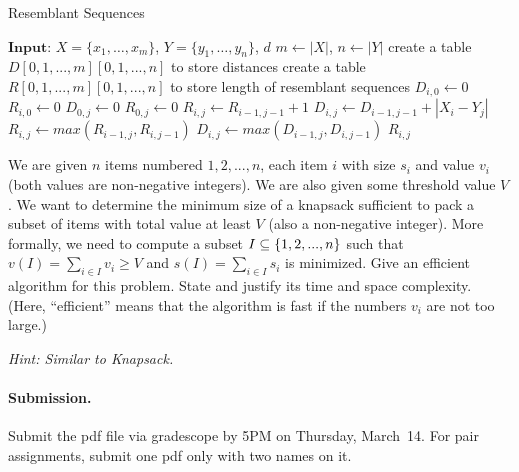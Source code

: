 \documentclass[11pt]{article}
\begin{document}
\begin{algorithm}
    \begin{algorithmic}[1]
        \caption{Resemblant Sequences}
        \State $\textbf{Input: } X =\{x_1,\dots,x_m\}$, $Y =\{y_1,\dots,y_n\}$, $d$
        \State $m \gets |X|$, $n \gets |Y|$
        \State create a table $D[0,1,...,m][0,1,...,n]$ to store distances
        \State create a table $R[0,1,...,m][0,1,...,n]$ to store length of resemblant sequences
            \State $D_{i,0} \gets 0$
            \State $R_{i,0} \gets 0$
        \EndFor
            \State $D_{0,j} \gets 0$
            \State $R_{0,j} \gets 0$
        \EndFor
                        \State $R_{i,j} \gets R_{i-1,j-1} + 1$
                        \State $D_{i,j} \gets D_{i-1,j-1} + |X_i - Y_j|$
                    \Else
                        \State $R_{i,j} \gets max(R_{i-1,j}, R_{i,j-1})$
                        \State $D_{i,j} \gets max(D_{i-1,j}, D_{i,j-1})$
                    \EndIf
                \EndIf
            \EndFor
        \EndFor
                    \Return $R_{i,j}$
                \EndIf
            \EndFor
        \EndFor
    \end{algorithmic}
\end{algorithm}


\newpage

\begin{problem}
We are given $n$ items numbered $1,2,...,n$, each item $i$ with size $s_i$ and value $v_i$ (both values are non-negative integers). We are also given some threshold value $V$. We want to determine the minimum size of a knapsack sufficient to pack a subset of items with total value at least $V$ (also a non-negative
integer). More formally, we need to compute a subset $I \subseteq {\left\{ 1,2,...,n \right\} }$ such that $v(I) = \sum_{i\in I} v_i \ge V$ and $s(I) = \sum_{i\in I} s_i$ is minimized.
Give an efficient algorithm for this problem. State and justify its time and space complexity. 
(Here, ``efficient'' means that the algorithm is fast if the numbers $v_i$ are not too large.) 

\noindent\emph{Hint: Similar to Knapsack.} 
\end{problem}









\vskip 0.3in
\paragraph{Submission.}
Submit the pdf file via gradescope by 5PM on Thursday, March~14.
For pair assignments, submit one pdf only with two names on it.
\end{document}
